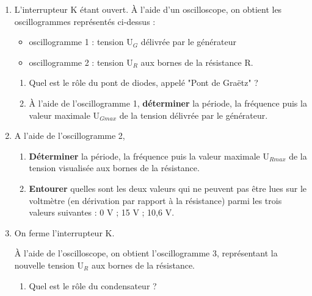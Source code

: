 \documentclass[11pt,a4paper]{article}
\begin{document}
\begin{enumerate}
\item L'interrupteur K étant ouvert. À l'aide d'un oscilloscope, on obtient les oscillogrammes représentés ci-dessus :
\begin{itemize}[label=--]
\item oscillogramme 1 : tension U$_G$ délivrée par le générateur
\item oscillogramme 2 : tension U$_R$ aux bornes de la résistance R.
\end{itemize}

\begin{enumerate}
\item Quel est le rôle du pont de diodes, appelé "Pont de Graëtz" ?

\dotfill

\dotfill

\item À l'aide de l'oscillogramme 1, \textbf{déterminer} la période, la fréquence puis la valeur maximale U$_{Gmax}$ de la tension délivrée par le générateur.

\dotfill

\dotfill

\dotfill
\end{enumerate}

\item A l'aide de l'oscillogramme 2,

\begin{enumerate}
\item \textbf{Déterminer} la période, la fréquence puis la valeur maximale U$_{Rmax}$ de la tension visualisée aux bornes de la résistance.

\dotfill

\dotfill

\dotfill

\item \textbf{Entourer} quelles sont les deux valeurs qui ne peuvent pas être lues sur le voltmètre (en dérivation par rapport à la résistance) parmi les trois valeurs suivantes : 0 V ; 15 V ; 10,6 V.
\end{enumerate}

\item On ferme l'interrupteur K.

À l'aide de l'oscilloscope, on obtient l'oscillogramme 3, représentant la nouvelle tension U$_R$ aux bornes de la résistance.

\begin{enumerate}
\item Quel est le rôle du condensateur ?


\end{enumerate}
\end{enumerate}
\end{document}
